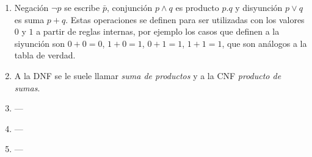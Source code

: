 \documentclass[a4paper]{article}
\begin{document}
\begin{enumerate}
\begin{enumerate} [label=(\alph*)]
		\item Negación $\neg p$ se escribe $\bar{p}$, conjunción $p\land q$ es producto $p.q$ y disyunción $p \lor q$ es suma $p+q$. Estas operaciones se definen para ser utilizadas con los valores $0$ y $1$ a partir de reglas internas, por ejemplo los casos que definen a la siyunción son $0+0=0$, $1+0=1$, $0+1=1$, $1+1=1$, que son análogos a la tabla de verdad.
		\item A la DNF se le suele llamar \textit{suma de productos} y a la CNF \textit{producto de sumas}.
\item ---\item ---\item ---\end{enumerate}\end{enumerate}
\end{document}
